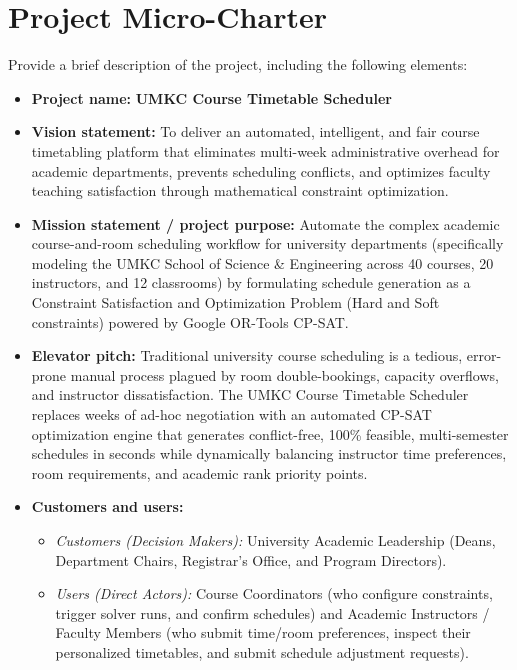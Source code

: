 \documentclass[11pt,letterpaper]{article}
\begin{document}
\section{Project Micro-Charter}
Provide a brief description of the project, including the following elements:

\begin{itemize}[leftmargin=1.5em, itemsep=5pt, topsep=4pt]
    \item \textbf{Project name:} \textbf{\color{umkcblue}UMKC Course Timetable Scheduler}
    
    \item \textbf{Vision statement:} To deliver an automated, intelligent, and fair course timetabling platform that eliminates multi-week administrative overhead for academic departments, prevents scheduling conflicts, and optimizes faculty teaching satisfaction through mathematical constraint optimization.
    
    \item \textbf{Mission statement / project purpose:} Automate the complex academic course-and-room scheduling workflow for university departments (specifically modeling the UMKC School of Science \& Engineering across 40 courses, 20 instructors, and 12 classrooms) by formulating schedule generation as a Constraint Satisfaction and Optimization Problem (Hard and Soft constraints) powered by Google OR-Tools CP-SAT.
    
    \item \textbf{Elevator pitch:} Traditional university course scheduling is a tedious, error-prone manual process plagued by room double-bookings, capacity overflows, and instructor dissatisfaction. The UMKC Course Timetable Scheduler replaces weeks of ad-hoc negotiation with an automated CP-SAT optimization engine that generates conflict-free, 100\% feasible, multi-semester schedules in seconds while dynamically balancing instructor time preferences, room requirements, and academic rank priority points.
    
    \item \textbf{Customers and users:} 
    \begin{itemize}[itemsep=2pt, topsep=2pt]
        \item \textit{Customers (Decision Makers):} University Academic Leadership (Deans, Department Chairs, Registrar's Office, and Program Directors).
        \item \textit{Users (Direct Actors):} Course Coordinators (who configure constraints, trigger solver runs, and confirm schedules) and Academic Instructors / Faculty Members (who submit time/room preferences, inspect their personalized timetables, and submit schedule adjustment requests).
    \end{itemize}
    

\end{itemize}
\end{document}
